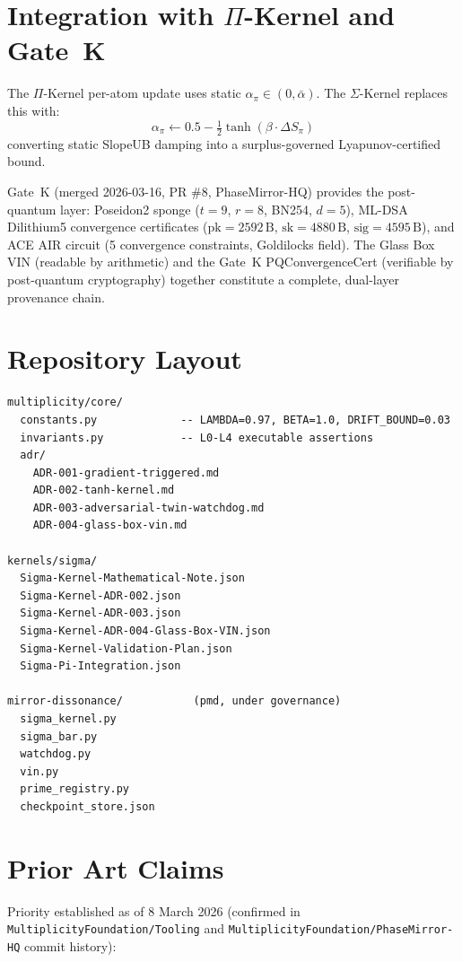 \documentclass[12pt,letterpaper]{article}
\begin{document}
\section{Integration with \texorpdfstring{$\Pi$}{Pi}-Kernel and Gate~K}\label{sec:gates}

The $\Pi$-Kernel per-atom update uses static $\alpha_\pi\in(0,\bar\alpha)$.
The $\Sigma$-Kernel replaces this with:
\[
  \alpha_\pi \leftarrow 0.5 - \tfrac{1}{2}\tanh(\beta\cdot\Delta S_\pi)
\]
converting static SlopeUB damping into a surplus-governed Lyapunov-certified bound.

Gate~K (merged 2026-03-16, PR \#8, PhaseMirror-HQ) provides the post-quantum layer:
Poseidon2 sponge ($t=9$, $r=8$, BN254, $d=5$),
ML-DSA Dilithium5 convergence certificates
($\mathrm{pk}=2592\,\mathrm{B}$, $\mathrm{sk}=4880\,\mathrm{B}$,
$\mathrm{sig}=4595\,\mathrm{B}$), and ACE AIR circuit
(5 convergence constraints, Goldilocks field).
The Glass Box VIN (readable by arithmetic) and the Gate~K
PQConvergenceCert (verifiable by post-quantum cryptography)
together constitute a complete, dual-layer provenance chain.

\section{Repository Layout}\label{sec:repo}
\begin{lstlisting}[language={},caption={Target repository layout.}]
multiplicity/core/
  constants.py             -- LAMBDA=0.97, BETA=1.0, DRIFT_BOUND=0.03
  invariants.py            -- L0-L4 executable assertions
  adr/
    ADR-001-gradient-triggered.md
    ADR-002-tanh-kernel.md
    ADR-003-adversarial-twin-watchdog.md
    ADR-004-glass-box-vin.md

kernels/sigma/
  Sigma-Kernel-Mathematical-Note.json
  Sigma-Kernel-ADR-002.json
  Sigma-Kernel-ADR-003.json
  Sigma-Kernel-ADR-004-Glass-Box-VIN.json
  Sigma-Kernel-Validation-Plan.json
  Sigma-Pi-Integration.json

mirror-dissonance/           (pmd, under governance)
  sigma_kernel.py
  sigma_bar.py
  watchdog.py
  vin.py
  prime_registry.py
  checkpoint_store.json
\end{lstlisting}

\section{Prior Art Claims}\label{sec:priorart}

Priority established as of 8 March 2026 (confirmed in
\texttt{MultiplicityFoundation/Tooling} and
\texttt{MultiplicityFoundation/PhaseMirror-HQ} commit history):
\end{document}
